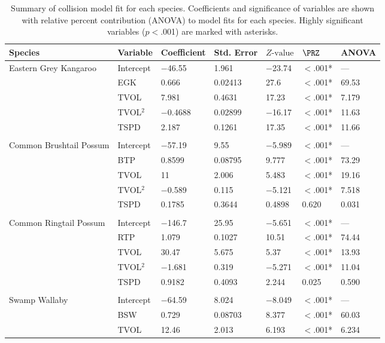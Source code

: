 \begin{table}[!t]
\caption[Summary of collision models for six mammal species]{Summary of collision model fit for each species. Coefficients and significance of variables are shown with relative percent contribution (ANOVA) to model fits for each species. Highly significant variables ($p<$.001) are marked with asterisks.}
\centering
\begin{tabularx}{0.9\textwidth}{@{}lllllll@{}} \toprule
Species & Variable & Coefficient & Std. Error & $Z\text{-value}$ & $\PRZ$ & ANOVA \\ 
\midrule
Eastern Grey Kangaroo & Intercept & $-$46.55 & 1.961 & $-$23.74 & $<$.001* & --- \\ 
   & EGK & 0.666 & 0.02413 & 27.6 & $<$.001* & 69.53 \\ 
   & TVOL & 7.981 & 0.4631 & 17.23 & $<$.001* & 7.179 \\ 
   & TVOL$^2$ & $-$0.4688 & 0.02899 & $-$16.17 & $<$.001* & 11.63 \\ 
   & TSPD & 2.187 & 0.1261 & 17.35 & $<$.001* & 11.66 \\ 
   &  &  &  &  &  &  \\ 
Common Brushtail Possum & Intercept & $-$57.19 & 9.55 & $-$5.989 & $<$.001* & --- \\ 
   & BTP & 0.8599 & 0.08795 & 9.777 & $<$.001* & 73.29 \\ 
   & TVOL & 11 & 2.006 & 5.483 & $<$.001* & 19.16 \\ 
   & TVOL$^2$ & $-$0.589 & 0.115 & $-$5.121 & $<$.001* & 7.518 \\ 
   & TSPD & 0.1785 & 0.3644 & 0.4898 & 0.620 & 0.031 \\ 
   &  &  &  &  &  &  \\ 
Common Ringtail Possum & Intercept & $-$146.7 & 25.95 & $-$5.651 & $<$.001* & --- \\ 
   & RTP & 1.079 & 0.1027 & 10.51 & $<$.001* & 74.44 \\ 
   & TVOL & 30.47 & 5.675 & 5.37 & $<$.001* & 13.93 \\ 
   & TVOL$^2$ & $-$1.681 & 0.319 & $-$5.271 & $<$.001* & 11.04 \\ 
   & TSPD & 0.9182 & 0.4093 & 2.244 & 0.025 & 0.590 \\ 
   &  &  &  &  &  &  \\ 
Swamp Wallaby & Intercept & $-$64.59 & 8.024 & $-$8.049 & $<$.001* & --- \\ 
   & BSW & 0.729 & 0.08703 & 8.377 & $<$.001* & 60.03 \\ 
   & TVOL & 12.46 & 2.013 & 6.193 & $<$.001* & 6.234 \\ 

\end{tabularx}
\end{table}
